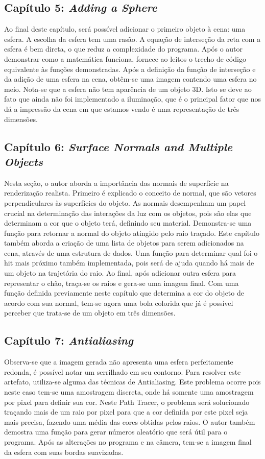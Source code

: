 \documentclass[journal]{IEEEtran}
\begin{document}
\subsection*{Capítulo 5: \emph{Adding a Sphere}}
Ao final deste capítulo, será possível adicionar o primeiro objeto à cena: uma esfera. A escolha da esfera
tem uma rasão. A equação de interseção da reta com a esfera é bem direta, o que reduz a complexidade do
programa. Após o autor demonstrar como a matemática funciona, fornece ao leitos o trecho de código equivalente
às funções demonstradas. Após a definição da função de interseção e da adição de uma esfera na cena, obtêm-se
uma imagem contendo uma esfera no meio. Nota-se que a esfera não tem aparência de um objeto 3D. Isto se deve
ao fato que ainda não foi implementado a iluminação, que é o principal fator que nos dá a impressão da cena 
em que estamos vendo é uma representação de três dimensões.

\subsection*{Capítulo 6: \emph{Surface Normals and Multiple Objects}}
Nesta seção, o autor aborda a importância das normais de superfície na renderização realista. Primeiro é
explicado o conceito de normal, que são vetores perpendiculares às superfícies do objeto. As normais 
desempenham um papel crucial na determinação das interações da luz com os objetos, pois são elas que
determinam a cor que o objeto terá, definindo seu material. Demonstra-se uma função para retornar a normal
do objeto atingido pelo raio traçado. Este capítulo também aborda a criação de uma lista de objetos para
serem adicionados na cena, através de uma estrutura de dados. Uma função para determinar qual foi o
hit mais próximo também implementada, pois será de ajuda quando há mais de um objeto na trajetória do raio.
Ao final, após adicionar outra esfera para representar o chão, traça-se os raios e gera-se uma imagem final.
Com uma função definida previamente neste capítulo que determina a cor do objeto de acordo com sua normal,
tem-se agora uma bola colorida que já é possível perceber que trata-se de um objeto em três dimensões.

\subsection*{Capítulo 7: \emph{Antialiasing}}
Observa-se que a imagem gerada não apresenta uma esfera perfeitamente redonda, é possível notar um serrilhado
em seu contorno. Para resolver este artefato, utiliza-se alguma das técnicas de Antialiasing. Este problema
ocorre pois neste caso tem-se uma amostragem discreta, onde há somente uma amostragem por pixel para definir
sua cor. Neste Path Tracer, o problema será solucionado traçando mais de um raio por pixel para que a cor
definida por este pixel seja mais precisa, fazendo uma média das cores obtidas pelos raios. O autor também
demostra uma função para gerar números aleatório que será útil para o programa. Após as alterações no programa
e na câmera, tem-se a imagem final da esfera com suas bordas suavizadas.
\end{document}
